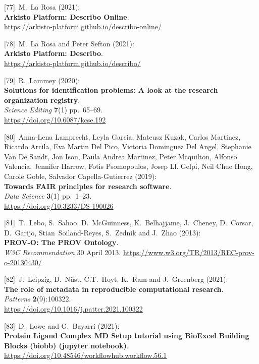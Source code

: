 {[}77{]}~M.~La Rosa (2021):\\
\textbf{Arkisto Platform: Describo Online}.\\
\url{https://arkisto-platform.github.io/describo-online/}

{[}78{]}~M.~La Rosa and Peter Sefton (2021):\\
\textbf{Arkisto Platform: Describo}.\\
\url{https://arkisto-platform.github.io/describo/}

{[}79{]}~R.~Lammey (2020):\\
\textbf{Solutions for identification problems: A look at the research
organization registry}.\\
\emph{Science Editing} \textbf{7}(1) pp.~65--69.\\
\url{https://doi.org/10.6087/kcse.192}

{[}80{]}~Anna-Lena Lamprecht, Leyla Garcia, Mateusz Kuzak, Carlos
Martinez, Ricardo Arcila, Eva Martin Del Pico, Victoria Dominguez Del
Angel, Stephanie Van De Sandt, Jon Ison, Paula Andrea Martinez, Peter
Mcquilton, Alfonso Valencia, Jennifer Harrow, Fotis Psomopoulos, Josep
Ll. Gelpi, Neil Chue Hong, Carole Goble, Salvador Capella-Gutierrez
(2019):\\
\textbf{Towards FAIR principles for research software}.\\
\emph{Data Science} \textbf{3}(1) pp.~1--23.\\
\url{https://doi.org/10.3233/DS-190026}

{[}81{]}~T.~Lebo, S.~Sahoo, D.~McGuinness, K.~Belhajjame, J.~Cheney,
D.~Corsar, D.~Garijo, Stian~Soiland-Reyes, S.~Zednik and J.~Zhao
(2013):\\
\textbf{PROV-O: The PROV Ontology}.\\
\emph{W3C Recommendation} 30 April 2013.
\url{https://www.w3.org/TR/2013/REC-prov-o-20130430/}

{[}82{]}~J.~Leipzig, D.~Nüst, C.T.~Hoyt, K.~Ram and J.~Greenberg
(2021):\\
\textbf{The role of metadata in reproducible computational research}.\\
\emph{Patterns} \textbf{2}(9):100322.\\
\url{https://doi.org/10.1016/j.patter.2021.100322}

{[}83{]}~D.~Lowe and G.~Bayarri (2021):\\
\textbf{Protein Ligand Complex MD Setup tutorial using BioExcel Building
Blocks (biobb) (jupyter notebook)}.\\
\url{https://doi.org/10.48546/workflowhub.workflow.56.1}

